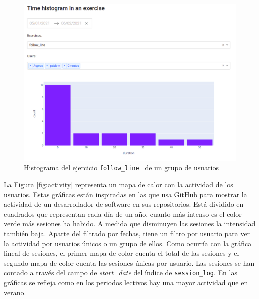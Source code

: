 \begin{figure}[H]
    \centering
    \includegraphics[width=17cm, keepaspectratio]{img/histogram_exercise.png}
    \caption{Histograma del ejercicio \texttt{follow\_line } de un grupo de usuarios }
    \label{fig:histogram_exercise}
\end{figure}

La Figura \ref{fig:activity} representa un mapa de calor con la actividad de los usuarios. Estas gráficas están inspiradas en las que usa GitHub para mostrar la actividad de un desarrollador de software en sus repositorios. Está dividido en cuadrados que representan cada día de un año, cuanto más intenso es el color verde más sesiones ha habido. A medida que disminuyen las sesiones la intensidad también baja. Aparte del filtrado por fechas, tiene un filtro por usuario para ver la actividad por usuarios únicos o un grupo de ellos. Como ocurría con la gráfica lineal de sesiones, el primer mapa de color cuenta el total de las sesiones y el segundo mapa de color cuenta las sesiones únicas por usuario. Las sesiones se han contado a través del campo de \textit{start\_date} del índice de \texttt{session\_log}. En las gráficas se refleja como en los periodos lectivos hay una mayor actividad que en verano.\\





